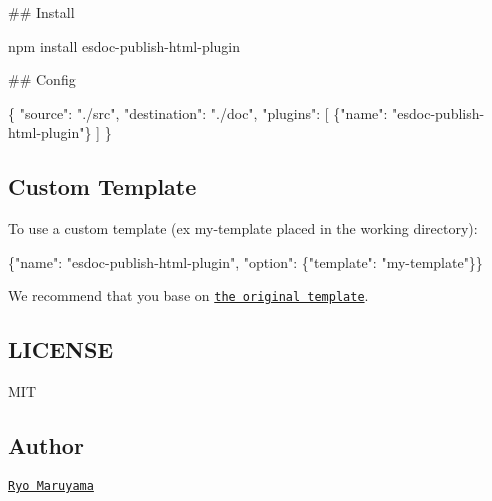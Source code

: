 \#\# Install 
\begin{DoxyCode}
npm install esdoc-publish-html-plugin
\end{DoxyCode}


\#\# Config 
\begin{DoxyCode}
\{
  "source": "./src",
  "destination": "./doc",
  "plugins": [
    \{"name": "esdoc-publish-html-plugin"\}
  ]
\}
\end{DoxyCode}


\subsection*{Custom Template}

To use a custom template (ex {\ttfamily my-\/template} placed in the working directory)\+: 
\begin{DoxyCode}
\{"name": "esdoc-publish-html-plugin", "option": \{"template": "my-template"\}\}
\end{DoxyCode}


We recommend that you base on \href{https://github.com/esdoc/esdoc-plugins/tree/master/esdoc-publish-html-plugin/src/Builder/template}{\tt the original template}.

\subsection*{L\+I\+C\+E\+N\+SE}

M\+IT

\subsection*{Author}

\href{https://github.com/h13i32maru}{\tt Ryo Maruyama} 
